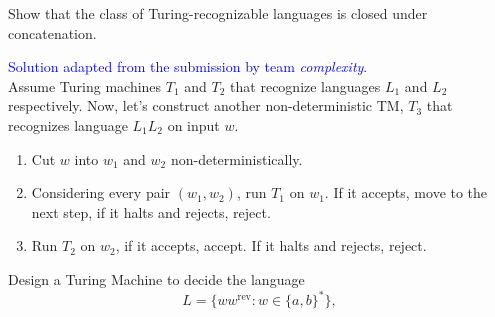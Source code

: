 \documentclass[a4page]{exam}
\begin{document}
\begin{questions}
\question[20] Show that the class of Turing-recognizable languages is closed under concatenation.
  \begin{solution}
    \textcolor{blue}{Solution adapted from the submission by team \textit{complexity}}.\\
    Assume Turing machines $T_1$ and $T_2$ that recognize languages $L_1$ and $L_2$ respectively. Now, let's construct another non-deterministic TM, $T_3$ that recognizes language $L_1 L_2$ on input $w$.
    \begin{enumerate}
    \item Cut $w$ into $w_1$ and $w_2$ non-deterministically. 
    \item Considering every pair $(w_1, w_2)$, run $T_1$ on $w_1$. If it accepts, move to the next step, if it halts and rejects, reject. 
    \item Run $T_2$ on $w_2$, if it accepts, accept. If it halts and rejects, reject.
    \end{enumerate}
  \end{solution}

\question[20] Design a Turing Machine to decide the language
  \[
    L =\{ w w^{\text{rev}} : w \in \{a,b\}^* \},
  \]


\end{questions}
\end{document}
